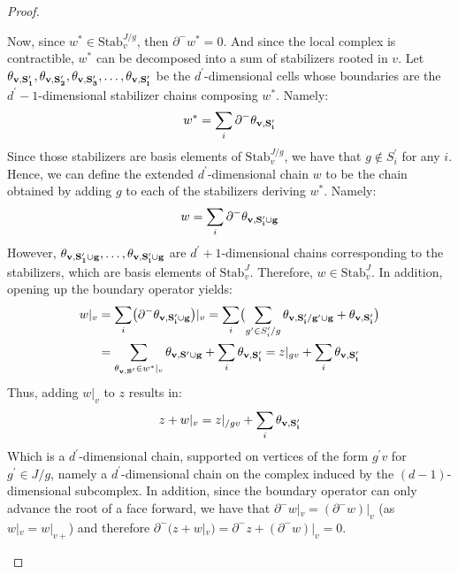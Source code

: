 \begin{proof}
\begin{enumerate}
      
      Now, since $w^{*} \in \text{Stab}_{v}^{J/g}$, then $\partial^{-}w^{*} = 0$. And since the local complex is contractible, $w^{*}$ can be decomposed into a sum of stabilizers rooted in $v$. Let $\mathbf{\theta_{v ,S^{\prime}_{1}} }, \mathbf{\theta_{v ,S^{\prime}_{2}} }, \mathbf{\theta_{v ,S^{\prime}_{3}} }, \ldots, \mathbf{\theta_{v ,S^{\prime}_{l}} }$ be the $d^{\prime}$-dimensional cells whose boundaries are the $d^{\prime}-1$-dimensional stabilizer chains composing $w^{*}$. Namely:
      \begin{equation*}
        \begin{split}
          w^{*} = \sum_{i} \partial^{-} \mathbf{\theta_{v ,S^{\prime}_{i}} } 
        \end{split}
      \end{equation*}
Since those stabilizers are basis elements of $\text{Stab}_{v}^{J/g}$, we have that $g \notin S^{\prime}_{i}$ for any $i$. Hence, we can define the extended $d^{\prime}$-dimensional chain $w$ to be the chain obtained by adding $g$ to each of the stabilizers deriving $w^{*}$. Namely:
      \begin{equation*}
        \begin{split}
          w =  \sum_{i} \partial^{-} \mathbf{\theta_{v ,S^{\prime}_{i} \cup g} } 
        \end{split}
      \end{equation*}
      However, $\mathbf{\theta_{v ,S^{\prime}_{1} \cup g} }, \ldots, \mathbf{\theta_{v ,S^{\prime}_{l} \cup g} }$ are $d^{\prime}+1$-dimensional chains corresponding to the stabilizers, which are basis elements of $\text{Stab}_{v}^{J}$. Therefore, $w \in \text{Stab}^{J}_{v}$. In addition, opening up the boundary operator yields:
      \begin{equation*}
        \begin{split}
          w|_{v} &=  \sum_{i} \bigl(\partial^{-} \mathbf{\theta_{v ,S^{\prime}_{i} \cup g} } \bigr)|_{v} = \sum_{i} \bigl(\sum_{g^{\prime} \in S^{\prime}_{i}/g}\mathbf{\theta_{v ,S^{\prime}_{i}/g^{\prime} \cup g} } + \mathbf{\theta_{v ,S^{\prime}_{i}} }   \bigr)\\
          &= \sum_{\mathbf{\theta_{v ,S^{\prime}}{} }{}\in w^{*}|_{v} }\mathbf{\theta_{v ,S^{\prime} \cup g} } + \sum_{i} \mathbf{\theta_{v ,S^{\prime}_{i}} } = z|_{gv} + \sum_{i} \mathbf{\theta_{v ,S^{\prime}_{i}} } 
        \end{split}
      \end{equation*}
Thus, adding $w|_{v}$ to $z$ results in:
      \begin{equation*}
        \begin{split}
          z + w|_{v} = z|_{/gv} + \sum_{i} \mathbf{\theta_{v ,S^{\prime}_{i}} } 
        \end{split}
      \end{equation*}
      Which is a $d^{\prime}$-dimensional chain, supported on vertices of the form $g^{\prime}v$ for $g^{\prime}\in J/g$, namely a $d^\prime$-dimensional chain on the complex induced by the $(d-1)$-dimensional subcomplex. In addition, since the boundary operator can only advance the root of a face forward, we have that $\partial^{-} w|_{v} =  (\partial^{-} w)|_{v}$ (as $w|_{v}=w|_{v+}$) and therefore $\partial^{-}( z + w|_{v}) = \partial^{-}z + (\partial^{-}w)|_{v} = 0$.
      

\end{enumerate}
\end{proof}

